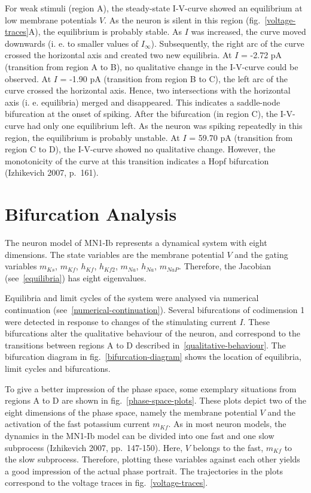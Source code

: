 \documentclass[12pt,a4paper,]{report}
\begin{document}
For weak stimuli (region A), the steady-state I-V-curve showed an
equilibrium at low membrane potentials $V$. As the neuron is silent in
this region (fig.~\ref{voltage-traces}A), the equilibrium is probably
stable. As $I$ was increased, the curve moved downwards (i. e. to
smaller values of $I_{\infty}$). Subsequently, the right arc of the
curve crossed the horizontal axis and created two new equilibria. At $I$
= -2.72 pA (transition from region A to B), no qualitative change in the
I-V-curve could be observed. At $I$ = -1.90 pA (transition from region B
to C), the left arc of the curve crossed the horizontal axis. Hence, two
intersections with the horizontal axis (i. e. equilibria) merged and
disappeared. This indicates a saddle-node bifurcation at the onset of
spiking. After the bifurcation (in region C), the I-V-curve had only one
equilibrium left. As the neuron was spiking repeatedly in this region,
the equilibrium is probably unstable. At $I$ = 59.70 pA (transition from
region C to D), the I-V-curve showed no qualitative change. However, the
monotonicity of the curve at this transition indicates a Hopf
bifurcation (Izhikevich 2007, p.~161).

\section{Bifurcation Analysis}\label{bifurcation-analysis}

The neuron model of MN1-Ib represents a dynamical system with eight
dimensions. The state variables are the membrane potential $V$ and the
gating variables $m_{Ks}$, $m_{Kf}$, $h_{Kf}$, $h_{Kf2}$, $m_{Na}$,
$h_{Na}$, $m_{NaP}$. Therefore, the Jacobian (see~\ref{equilibria}) has
eight eigenvalues.

Equilibria and limit cycles of the system were analysed via numerical
continuation (see~\ref{numerical-continuation}). Several bifurcations of
codimension 1 were detected in response to changes of the stimulating
current $I$. These bifurcations alter the qualitative behaviour of the
neuron, and correspond to the transitions between regions A to D
described in~\ref{qualitative-behaviour}. The bifurcation diagram in
fig.~\ref{bifurcation-diagram} shows the location of equilibria, limit
cycles and bifurcations.

To give a better impression of the phase space, some exemplary
situations from regions A to D are shown in
fig.~\ref{phase-space-plots}. These plots depict two of the eight
dimensions of the phase space, namely the membrane potential $V$ and the
activation of the fast potassium current $m_{Kf}$. As in most neuron
models, the dynamics in the MN1-Ib model can be divided into one fast
and one slow subprocess (Izhikevich 2007, pp.~147-150). Here, $V$
belongs to the fast, $m_{Kf}$ to the slow subprocess. Therefore,
plotting these variables against each other yields a good impression of
the actual phase portrait. The trajectories in the plots correspond to
the voltage traces in fig.~\ref{voltage-traces}.
\end{document}
